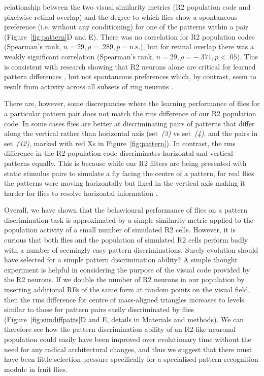 relationship between the two visual similarity metrics (R2 population code and pixelwise retinal overlap) and the degree to which flies show a spontaneous preference (i.e. without any conditioning) for one of the patterns within a pair (Figure~\ref{fig:pattern}D and E). There was no correlation for R2 population codes (Spearman's rank, $n = 29, \rho = .289, p = \mathrm{n.s.}$), but for retinal overlap there was a weakly significant correlation (Spearman's rank, $n = 29, \rho = -.371, p < .05$). This is consistent with research showing that R2 neurons alone are critical for learned pattern differences \cite{Ernst1999}, but not spontaneous preferences which, by contrast, seem to result from activity across all subsets of ring neurons \cite{Solanki2015}.

There are, however, some discrepancies where the learning performance of flies for a particular pattern pair does not match the \ac{rms} difference of our R2 population code. In some cases flies are better at discriminating pairs of patterns that differ along the vertical rather than horizontal axis (set~\emph{(3)} vs set~\emph{(4)}, and the pairs in set~\emph{(12)}, marked with red Xs in Figure~\ref{fig:pattern}). In contrast, the \ac{rms} difference in the R2 population code discriminates horizontal and vertical patterns equally. This is because while our R2 filters are being presented with static stimulus pairs to simulate a fly facing the centre of a pattern, for real flies the patterns were moving horizontally but fixed in the vertical axis making it harder for flies to resolve horizontal information \cite{Ernst1999}.

Overall, we have shown that the behavioural performance of flies on a pattern discrimination task is approximated by a simple similarity metric applied to the population activity of a small number of simulated R2 cells. However, it is curious that both flies and the population of simulated R2 cells perform badly with a number of seemingly easy pattern discriminations. Surely evolution should have selected for a simple pattern discrimination ability? A simple thought experiment is helpful in considering the purpose of the visual code provided by the R2 neurons. If we double the number of R2 neurons in our population by inserting additional \acp{RF} of the same form at random points on the visual field, then the \ac{rms} difference for centre of mass-aligned triangles increases to levels similar to those for pattern pairs easily discriminated by flies (Figure~\ref{fig:simdiffpatts}D and E, details in Materials and methods). We can therefore see how the pattern discrimination ability of an R2-like neuronal population could easily have been improved over evolutionary time without the need for any radical architectural changes, and thus we suggest that there must have been little selection pressure specifically for a specialised pattern recognition module in fruit flies.

